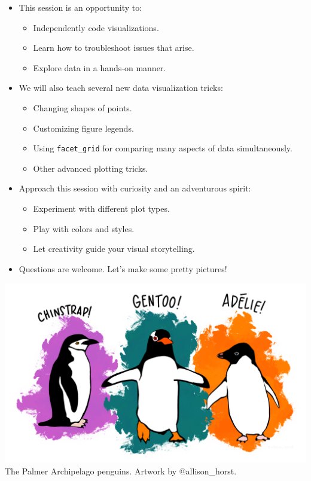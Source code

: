 \documentclass[
  letterpaper,
  DIV=11,
  numbers=noendperiod]{scrreprt}
\providecommand{\tightlist}{%
  \setlength{\itemsep}{0pt}\setlength{\parskip}{0pt}}\usepackage{longtable,booktabs,array}
\begin{document}
\begin{itemize}
\tightlist
\item
  This session is an opportunity to:

  \begin{itemize}
  \tightlist
  \item
    Independently code visualizations.
  \item
    Learn how to troubleshoot issues that arise.
  \item
    Explore data in a hands-on manner.
  \end{itemize}
\item
  We will also teach several new data visualization tricks:

  \begin{itemize}
  \tightlist
  \item
    Changing shapes of points.
  \item
    Customizing figure legends.
  \item
    Using \texttt{facet\_grid} for comparing many aspects of data
    simultaneously.
  \item
    Other advanced plotting tricks.
  \end{itemize}
\item
  Approach this session with curiosity and an adventurous spirit:

  \begin{itemize}
  \tightlist
  \item
    Experiment with different plot types.
  \item
    Play with colors and styles.
  \item
    Let creativity guide your visual storytelling.
  \end{itemize}
\item
  Questions are welcome. Let's make some pretty pictures!
\end{itemize}

\includegraphics{scripts/02_dataViz/DataVizDay2_files/lter_penguins.png}
The Palmer Archipelago penguins. Artwork by @allison\_horst.
\end{document}
